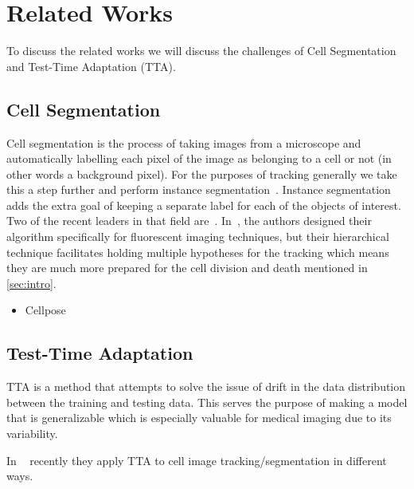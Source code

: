 \section{Related Works}
To discuss the related works we will discuss the challenges of Cell Segmentation and Test-Time Adaptation (TTA).

\subsection{Cell Segmentation}

Cell segmentation is the process of taking images from a microscope and automatically labelling each pixel of the image as belonging to a cell or not (in other words a background pixel).  For the purposes of tracking generally we take this a step further and perform instance segmentation~\cite{Yang_2019_ICCV}.  Instance segmentation adds the extra goal of keeping a separate label for each of the objects of interest.  \\ 

Two of the recent leaders in that field are~\cite{bragantini2024ucmtracking,chen2024cmtt}.  In~\cite{bragantini2024ucmtracking}, the authors designed their algorithm specifically for fluorescent imaging techniques, but their hierarchical technique facilitates holding multiple hypotheses for the tracking which means they are much more prepared for the cell division and death mentioned in \ref{sec:intro}.


\begin{itemize}

 

    
    \item Cellpose
    
    
\end{itemize}

\subsection{Test-Time Adaptation}

TTA is a method that attempts to solve the issue of drift in the data distribution between the training and testing data. This serves the purpose of making a model that is generalizable which is especially valuable for medical imaging due to its variability. 

In ~\cite{chen2024cmtt,Moshkov2020-uy} recently they apply TTA to cell image tracking/segmentation in different ways.\\

